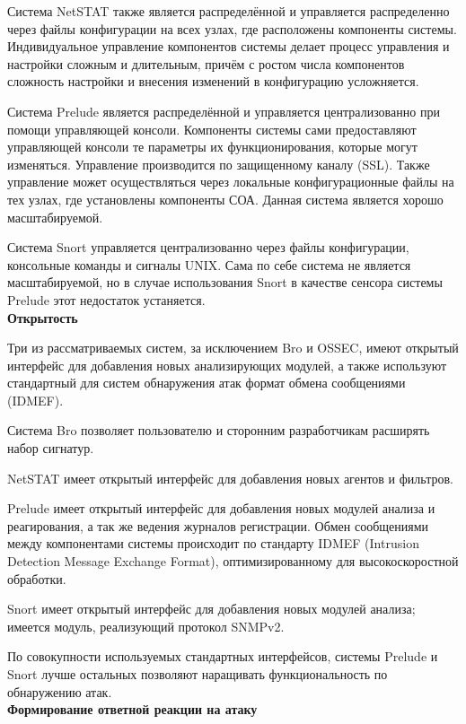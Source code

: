 Система NetSTAT также является распределённой и управляется распределенно
через файлы конфигурации на всех узлах, где расположены компоненты системы.
Индивидуальное управление компонентов системы делает процесс управления и
настройки сложным и длительным, причём с ростом числа компонентов сложность
настройки и внесения изменений в конфигурацию усложняется.

Система Prelude является распределённой и управляется централизованно при
помощи управляющей консоли. Компоненты системы сами предоставляют
управляющей консоли те параметры их функционирования, которые могут изменяться.
Управление производится по защищенному каналу (SSL). Также управление может
осуществляться через локальные конфигурационные файлы на тех узлах, где
установлены компоненты СОА. Данная система является хорошо масштабируемой.

Система Snort управляется централизованно через файлы конфигурации,
консольные команды и сигналы UNIX. Сама по себе система не является
масштабируемой, но в случае использования Snort в качестве сенсора системы Prelude этот недостаток устаняется.\\

\textbf{Открытость}

Три из рассматриваемых систем, за исключением Bro и OSSEC, имеют открытый
интерфейс для добавления новых анализирующих модулей, а также используют
стандартный для систем обнаружения атак формат обмена сообщениями (IDMEF).

Система Bro позволяет пользователю и сторонним разработчикам расширять набор
сигнатур.

NetSTAT имеет открытый интерфейс для добавления новых агентов и фильтров.

Prelude имеет открытый интерфейс для добавления новых модулей анализа и
реагирования, а так же ведения журналов регистрации. Обмен сообщениями между
компонентами системы происходит по стандарту IDMEF (Intrusion Detection Message
Exchange Format), оптимизированному для высокоскоростной обработки.

Snort имеет открытый интерфейс для добавления новых модулей анализа; имеется
модуль, реализующий протокол SNMPv2.

По совокупности используемых стандартных интерфейсов, системы Prelude и Snort
лучше остальных позволяют наращивать функциональность по обнаружению атак.\\

\textbf{Формирование ответной реакции на атаку}

